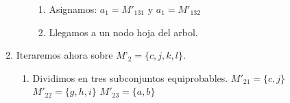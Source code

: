 \documentclass[12pt,a4paper]{article}
\begin{document}
\begin{enumerate}
\begin{enumerate}
\begin{enumerate}
 			\item Asignamos:
 			$a_1 = M'_{131}$ y $a_1=M'_{132}$ 
 			\item Llegamos a un nodo hoja del arbol.
 		\end{enumerate}
		 \end{enumerate}
		\item Iteraremos ahora sobre $M’_2=\{c,j,k,l\}$.
		\begin{enumerate}
			\item Dividimos en tres subconjuntos equiprobables.
			$M'_{21} = \{c,j\} $
			$M'_{22} = \{g,h,i\} $
			$M'_{23} = \{a,b\}$		
		\end{enumerate}
		
	\end{enumerate}
\end{document}
